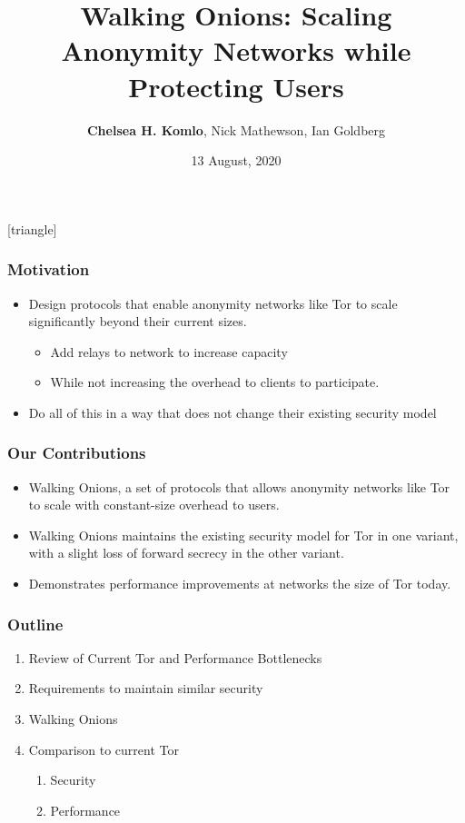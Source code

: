 \documentclass[hyperref={pdfpagelabels=true},table,dvipsnames,14pt,aspectratio=169]{beamer}
\title[Walking Onions]{Walking Onions: Scaling Anonymity Networks while Protecting Users}
\author{\textbf{Chelsea H. Komlo}, Nick Mathewson, Ian Goldberg}
\institute{\small{Presented at USENIX Security}}
\date{13 August, 2020}
\begin{document}
[triangle]

\begin{frame}
        \thispagestyle{empty}
        \maketitle
\end{frame}


\begin{frame}
\frametitle{Motivation}
  \begin{itemize}
    \item Design protocols that enable anonymity networks like Tor to scale
      significantly beyond their current sizes.
        \begin{itemize}
          \item Add relays to network to increase capacity
          \item While not increasing the overhead to clients to participate.
        \end{itemize}
    \item Do all of this in a way that does not change their existing security model
  \end{itemize}
\end{frame}

\begin{frame}
\frametitle{Our Contributions}
  \begin{itemize}
    \item Walking Onions, a set of protocols that allows anonymity networks
      like Tor to scale with constant-size overhead to users.
    \item Walking Onions maintains the existing security model for Tor in one
      variant, with a slight loss of forward secrecy in the other variant.
    \item Demonstrates performance improvements at networks the size of Tor
      today.
  \end{itemize}
\end{frame}

\begin{frame}
\frametitle{Outline}
  \begin{enumerate}
    \item Review of Current Tor and Performance Bottlenecks
    \item Requirements to maintain similar security
    \item Walking Onions
    \item Comparison to current Tor
      \begin{enumerate}
        \item Security
        \item Performance
      \end{enumerate}
  \end{enumerate}
\end{frame}
\end{document}
